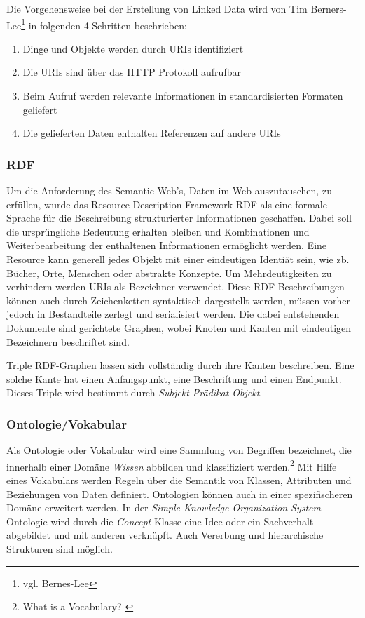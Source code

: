 Die Vorgehensweise bei der Erstellung von Linked Data wird von Tim Berners-Lee\footnote{vgl. Bernes-Lee\cite{ld}} in folgenden 4 Schritten beschrieben:

\begin{enumerate}
	\item Dinge und Objekte werden durch URIs identifiziert
	\item Die URIs sind über das HTTP Protokoll aufrufbar
	\item Beim Aufruf werden relevante Informationen in standardisierten Formaten geliefert
	\item Die gelieferten Daten enthalten Referenzen auf andere URIs
\end{enumerate}
\subsubsection{RDF}

Um die Anforderung des Semantic Web’s, Daten im Web auszutauschen, zu erfüllen, wurde das Resource Description Framework RDF als eine formale Sprache für die Beschreibung strukturierter Informationen geschaffen. Dabei soll die ursprüngliche Bedeutung erhalten bleiben und Kombinationen und Weiterbearbeitung der enthaltenen Informationen ermöglicht werden.
Eine Resource kann generell jedes Objekt mit einer eindeutigen Identiät sein, wie zb. Bücher, Orte, Menschen oder abstrakte Konzepte. Um Mehrdeutigkeiten zu verhindern werden URIs als Bezeichner verwendet. Diese RDF-Beschreibungen können auch durch Zeichenketten syntaktisch dargestellt werden, müssen vorher jedoch in Bestandteile zerlegt und serialisiert werden. Die dabei entstehenden Dokumente sind gerichtete Graphen, wobei Knoten und Kanten mit eindeutigen Bezeichnern beschriftet sind. \newline
 
Triple RDF-Graphen lassen sich vollständig durch ihre Kanten beschreiben. Eine solche Kante hat einen Anfangspunkt, eine Beschriftung und einen Endpunkt. Dieses Triple wird bestimmt durch \emph{Subjekt-Prädikat-Objekt}.

\subsubsection{Ontologie/Vokabular}

Als Ontologie oder Vokabular wird eine Sammlung von Begriffen bezeichnet, die innerhalb einer Domäne \textit{Wissen} abbilden und klassifiziert werden.\footnote{What is a Vocabulary?  \cite{w3c}} Mit Hilfe eines Vokabulars werden Regeln über die Semantik von Klassen, Attributen und Beziehungen von Daten definiert. Ontologien können auch in einer spezifischeren Domäne erweitert werden. In der \textit{Simple Knowledge Organization System} Ontologie wird durch die \textit{Concept} Klasse eine Idee oder ein Sachverhalt abgebildet und mit anderen verknüpft. Auch Vererbung und hierarchische Strukturen sind möglich.


